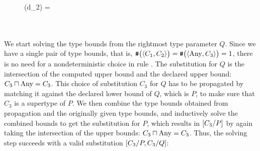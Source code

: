 \begin{figure}[h]
\small
\vspace*{-1.5em}
\infrule
  { \arrow(d_2) = {}
    \\%
    \\%
    \\%
  }
  {  }
\vspace*{-2em}
\end{figure}

\noindent
We start solving the type bounds from the rightmost type parameter $Q$.
Since we have a single pair of type bounds, that is,
$\bigcountof{\listof{C_1, C_2}} = \bigcountof{\listof{\Any, C_3}} = 1$,
there is no need for a nondeterministic choice in rule .
The substitution for $Q$ is the intersection of the computed upper bound
and the declared upper bound: $\mbox{\ensuremath{{C_3} \sqcap {\mathord{\mathrm{Any}}}}} = C_3$.
This choice of substitution $C_3$ for $Q$ has to be propagated by matching it
against the declared lower bound of $Q$, which is $P$, to make sure that
$C_3$ is a supertype of $P$.
We then combine the type bounds obtained from propagation and the originally
given type bounds, and inductively solve the combined bounds to get the
substitution for $P$, which results in $[C_3/P]$ by again taking the
intersection of the upper bounds: $\mbox{\ensuremath{{C_3} \sqcap {\mathord{\mathrm{Any}}}}} = C_3$.
Thus, the solving step succeeds with a valid substitution
$[C_3/P,C_3/Q]$:

\smallskip
\begin{figure}[h]
\small
\vspace*{-2em}
\infrule
  {
  \andalso
     \\[2pt]
  }
  {  }
\vspace*{-2em}
\end{figure}

